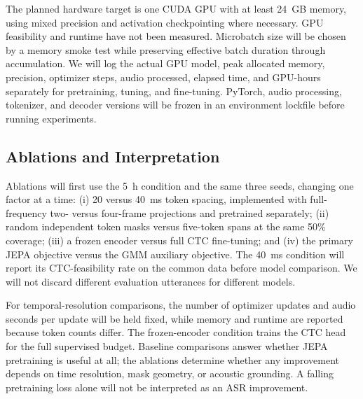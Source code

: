 The planned hardware target is one CUDA GPU with at least 24~GB memory, using mixed precision and activation checkpointing where necessary. GPU feasibility and runtime have not been measured. Microbatch size will be chosen by a memory smoke test while preserving effective batch duration through accumulation. We will log the actual GPU model, peak allocated memory, precision, optimizer steps, audio processed, elapsed time, and GPU-hours separately for pretraining, tuning, and fine-tuning. PyTorch, audio processing, tokenizer, and decoder versions will be frozen in an environment lockfile before running experiments.

\subsection{Ablations and Interpretation}
Ablations will first use the 5~h condition and the same three seeds, changing one factor at a time: (i) 20 versus 40~ms token spacing, implemented with full-frequency two- versus four-frame projections and pretrained separately; (ii) random independent token masks versus five-token spans at the same 50\% coverage; (iii) a frozen encoder versus full CTC fine-tuning; and (iv) the primary JEPA objective versus the GMM auxiliary objective. The 40~ms condition will report its CTC-feasibility rate on the common data before model comparison. We will not discard different evaluation utterances for different models.

For temporal-resolution comparisons, the number of optimizer updates and audio seconds per update will be held fixed, while memory and runtime are reported because token counts differ. The frozen-encoder condition trains the CTC head for the full supervised budget. Baseline comparisons answer whether JEPA pretraining is useful at all; the ablations determine whether any improvement depends on time resolution, mask geometry, or acoustic grounding. A falling pretraining loss alone will not be interpreted as an ASR improvement.

